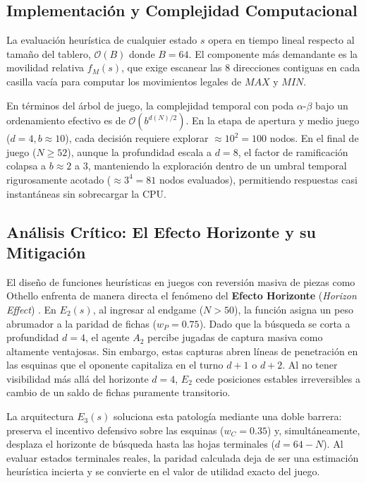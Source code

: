 \documentclass[10pt,a4paper]{article}
\begin{document}
\subsection{Implementación y Complejidad Computacional}
La evaluación heurística de cualquier estado $s$ opera en tiempo lineal respecto al tamaño del tablero, $\mathcal{O}(B)$ donde $B = 64$. El componente más demandante es la movilidad relativa $f_M(s)$, que exige escanear las 8 direcciones contiguas en cada casilla vacía para computar los movimientos legales de $MAX$ y $MIN$.

En términos del árbol de juego, la complejidad temporal con poda $\alpha$-$\beta$ bajo un ordenamiento efectivo es de $\mathcal{O}(b^{d(N)/2})$. En la etapa de apertura y medio juego ($d=4, b \approx 10$), cada decisión requiere explorar $\approx 10^2 = 100$ nodos. En el final de juego ($N \ge 52$), aunque la profundidad escala a $d=8$, el factor de ramificación colapsa a $b \approx 2$ a $3$, manteniendo la exploración dentro de un umbral temporal rigurosamente acotado ($\approx 3^4 = 81$ nodos evaluados), permitiendo respuestas casi instantáneas sin sobrecargar la CPU.

\subsection{Análisis Crítico: El Efecto Horizonte y su Mitigación}
El diseño de funciones heurísticas en juegos con reversión masiva de piezas como Othello enfrenta de manera directa el fenómeno del \textbf{Efecto Horizonte} (\textit{Horizon Effect}) \cite{russell2020artificial}. En $E_2(s)$, al ingresar al endgame ($N > 50$), la función asigna un peso abrumador a la paridad de fichas ($w_P = 0.75$). Dado que la búsqueda se corta a profundidad $d=4$, el agente $A_2$ percibe jugadas de captura masiva como altamente ventajosas. Sin embargo, estas capturas abren líneas de penetración en las esquinas que el oponente capitaliza en el turno $d+1$ o $d+2$. Al no tener visibilidad más allá del horizonte $d=4$, $E_2$ cede posiciones estables irreversibles a cambio de un saldo de fichas puramente transitorio.

La arquitectura $E_3(s)$ soluciona esta patología mediante una doble barrera: preserva el incentivo defensivo sobre las esquinas ($w_C = 0.35$) y, simultáneamente, desplaza el horizonte de búsqueda hasta las hojas terminales ($d = 64 - N$). Al evaluar estados terminales reales, la paridad calculada deja de ser una estimación heurística incierta y se convierte en el valor de utilidad exacto del juego.
\end{document}
